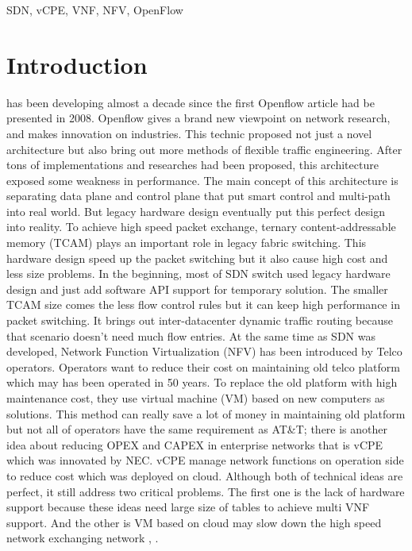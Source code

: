 \documentclass[journal]{IEEEtran}
\begin{document}
\begin{IEEEkeywords}
SDN, vCPE, VNF, NFV, OpenFlow
\end{IEEEkeywords}

\IEEEpeerreviewmaketitle{}


\section{Introduction}
\cite{sdn-new-norm} has been developing almost a decade since the first Openflow article had be presented in 2008\cite{openflow-campus-network}. Openflow\cite{sp:openflow1.3} gives a brand new viewpoint on network research, and makes innovation on industries. This technic proposed not just a novel architecture but also bring out more methods of flexible traffic engineering. After tons of implementations and researches had been proposed, this architecture exposed some weakness in performance. The main concept of this architecture is separating data plane and control plane that put smart control and multi-path into real world. But legacy hardware design eventually put this perfect design into reality. To achieve high speed packet exchange, ternary content-addressable memory (TCAM) plays an important role in legacy fabric switching. This hardware design speed up the packet switching but it also cause high cost and less size problems.
In the beginning, most of SDN switch used legacy hardware design and just add software API support for temporary solution. The smaller TCAM size comes the less flow control rules but it can keep high performance in packet switching. It brings out inter-datacenter dynamic traffic routing because that scenario doesn’t need much flow entries.
At the same time as SDN was developed, Network Function Virtualization (NFV) \cite{nfvwp}\cite{laptop-sdn} has been introduced by Telco operators. Operators want to reduce their cost on maintaining old telco platform which may has been operated in 50 years. To replace the old platform with high maintenance cost, they use virtual machine (VM) based on new computers as solutions. This method can really save a lot of money in maintaining old platform but not all of operators have the same requirement as AT\&T; there is another idea about reducing OPEX and CAPEX in enterprise networks that is vCPE which was innovated by NEC\cite{nec-vcpe}. vCPE manage network functions on operation side to reduce cost which was deployed on cloud. Although both of technical ideas are perfect, it still address two critical problems. The first one is the lack of hardware support because these ideas need large size of tables to achieve multi VNF support. And the other is VM based on cloud may slow down the high speed network exchanging network \cite{nfv-placemet}, \cite{nfv-placement-model}.
\end{document}
